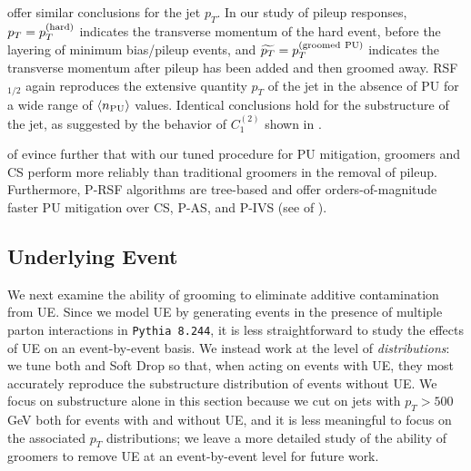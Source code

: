 \documentclass[letterpaper,11pt]{article}
\begin{document}
 offer similar conclusions for the jet \(p_T\).
%
In our study of pileup responses, \(p_T = p_T^{\rm(hard)}\) indicates the transverse momentum of the hard event, before the layering of minimum bias/pileup events, and \(\widetilde{p_T} = p_T^{\rm (groomed~PU)}\) indicates the transverse momentum after pileup has been added and then groomed away.
%
RSF\(_{1/2}\) again reproduces the extensive quantity \(p_T\) of the jet in the absence of PU for a wide range of \(\langle n_{\rm PU} \rangle\) values.
%
Identical conclusions hold for the substructure of the jet, as suggested by the behavior of \(C_1^{(2)}\) shown in .

 of  evince further that with our tuned procedure for PU mitigation, \PIRANHA{} groomers and CS perform more reliably than traditional groomers in the removal of pileup.
%
Furthermore, P-RSF algorithms are tree-based and offer orders-of-magnitude faster PU mitigation over CS, P-AS, and P-IVS (see  of ).


\subsection{Underlying Event}
\label{sec:ue}

We next examine the ability of grooming to eliminate additive contamination from UE.
%
Since we model UE by generating events in the presence of multiple parton interactions in \texttt{Pythia 8.244}, it is less straightforward to study the effects of UE on an event-by-event basis.
%
We instead work at the level of \textit{distributions}:
%
we tune both  and Soft Drop so that, when acting on events with UE, they most accurately reproduce the substructure distribution of events without UE.
%
We focus on substructure alone in this section because we cut on jets with \(p_T>500\) GeV both for events with and without UE, and it is less meaningful to focus on the associated \(p_T\) distributions;
%
we leave a more detailed study of the ability of \PIRANHA{} groomers to remove UE at an event-by-event level for future work.
\end{document}

